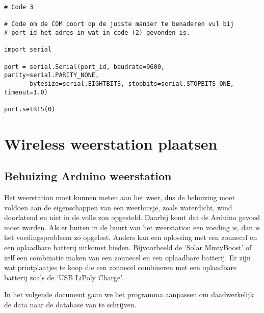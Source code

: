 \begin{verbatim}
# Code 3

# Code om de COM poort op de juiste manier te benaderen vul bij 
# port_id het adres in wat in code (2) gevonden is.

import serial 

port = serial.Serial(port_id, baudrate=9600, parity=serial.PARITY_NONE, 
       bytesize=serial.EIGHTBITS, stopbits=serial.STOPBITS_ONE, timeout=1.0) 

port.setRTS(0)

\end{verbatim}


\section{Wireless weerstation plaatsen}

\subsection{Behuizing Arduino weerstation} Het weerstation moet kunnen
meten aan het weer, dus de behuizing moet voldoen aan de eigenschappen
van een weerhuisje, zoals waterdicht, wind doorlatend en niet in de
volle zon opgesteld. Daarbij komt dat de Arduino gevoed moet worden. Als
er buiten in de buurt van het weerstation een voeding is, dan is het
voedingsprobleem zo opgelost. Anders kan een oplossing met een zonnecel
en een oplaadbare batterij uitkomst bieden. Bijvoorbeeld de `Solar
MintyBoost' of zelf een combinatie maken van een zonnecel en een
oplaadbare batterij. Er zijn wat printplaatjes te koop die een zonnecel
combineren met een oplaadbare batterij zoals de `USB LiPoly Charge'.

In het volgende document gaan we het programma aanpassen om daadwerkelijk de 
data naar de database van \hisparc te schrijven. 


 
\begin{thebibliography}{9}
    
\end{thebibliography}



